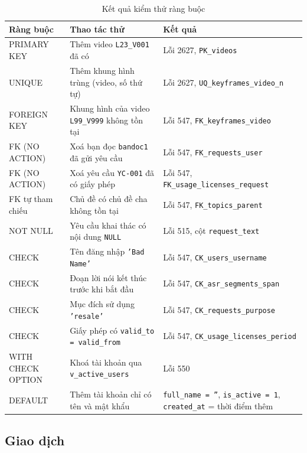 \begin{table}[H]
\centering
\caption{Kết quả kiểm thử ràng buộc}
\label{tab:constraint_tests}
\renewcommand{\arraystretch}{1.15}
\begin{tabularx}{\textwidth}{>{\raggedright\arraybackslash}p{2.4cm} >{\raggedright\arraybackslash}X >{\raggedright\arraybackslash}p{4.4cm}}
\toprule
\textbf{Ràng buộc} & \textbf{Thao tác thử} & \textbf{Kết quả} \\
\midrule
PRIMARY KEY & Thêm video \texttt{L23\_V001} đã có & Lỗi 2627, \texttt{PK\_videos} \\
UNIQUE & Thêm khung hình trùng (video, số thứ tự) & Lỗi 2627, \texttt{UQ\_keyframes\_video\_n} \\
FOREIGN KEY & Khung hình của video \texttt{L99\_V999} không tồn tại & Lỗi 547, \texttt{FK\_keyframes\_video} \\
FK (NO ACTION) & Xoá bạn đọc \texttt{bandoc1} đã gửi yêu cầu & Lỗi 547, \texttt{FK\_requests\_user} \\
FK (NO ACTION) & Xoá yêu cầu \texttt{YC-001} đã có giấy phép & Lỗi 547, \texttt{FK\_usage\_licenses\_request} \\
FK tự tham chiếu & Chủ đề có chủ đề cha không tồn tại & Lỗi 547, \texttt{FK\_topics\_parent} \\
NOT NULL & Yêu cầu khai thác có nội dung \texttt{NULL} & Lỗi 515, cột \texttt{request\_text} \\
CHECK & Tên đăng nhập \texttt{'Bad Name'} & Lỗi 547, \texttt{CK\_users\_username} \\
CHECK & Đoạn lời nói kết thúc trước khi bắt đầu & Lỗi 547, \texttt{CK\_asr\_segments\_span} \\
CHECK & Mục đích sử dụng \texttt{'resale'} & Lỗi 547, \texttt{CK\_requests\_purpose} \\
CHECK & Giấy phép có \texttt{valid\_to = valid\_from} & Lỗi 547, \texttt{CK\_usage\_licenses\_period} \\
WITH CHECK OPTION & Khoá tài khoản qua \texttt{v\_active\_users} & Lỗi 550 \\
DEFAULT & Thêm tài khoản chỉ có tên và mật khẩu & \texttt{full\_name = ''}, \texttt{is\_active = 1}, \texttt{created\_at} = thời điểm thêm \\
\bottomrule
\end{tabularx}
\end{table}

\subsection{Giao dịch}


